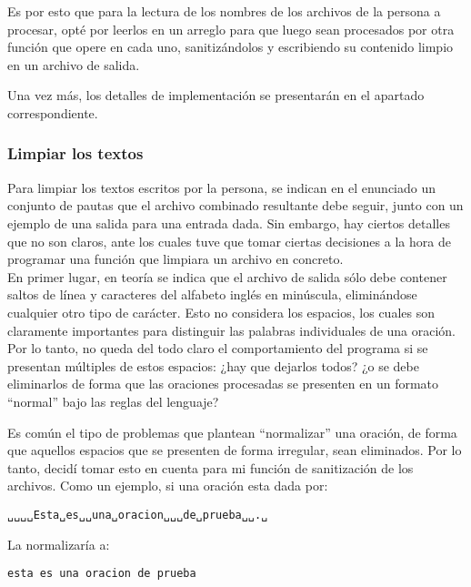 \documentclass[a4paper]{article}
\begin{document}
Es por esto que para la lectura de los nombres de los archivos de la persona a procesar, opté por leerlos en un arreglo para que luego sean procesados por otra función que opere en cada uno, sanitizándolos y escribiendo su contenido limpio en un archivo de salida.

Una vez más, los detalles de implementación se presentarán en el apartado correspondiente.

\subsubsection{Limpiar los textos}

Para limpiar los textos escritos por la persona, se indican en el enunciado un conjunto de pautas que el archivo combinado resultante debe seguir, junto con un ejemplo de una salida para una entrada dada. Sin embargo, hay ciertos detalles que no son claros, ante los cuales tuve que tomar ciertas decisiones a la hora de programar una función que limpiara un archivo en concreto. \\

En primer lugar, en teoría se indica que el archivo de salida sólo debe contener saltos de línea y caracteres del alfabeto inglés en minúscula, eliminándose cualquier otro tipo de carácter. Esto no considera los espacios, los cuales son claramente importantes para distinguir las palabras individuales de una oración. Por lo tanto, no queda del todo claro el comportamiento del programa si se presentan múltiples de estos espacios: ¿hay que dejarlos todos? ¿o se debe eliminarlos de forma que las oraciones procesadas se presenten en un formato ``normal'' bajo las reglas del lenguaje?

Es común el tipo de problemas que plantean ``normalizar'' una oración, de forma que aquellos espacios que se presenten de forma irregular, sean eliminados. Por lo tanto, decidí tomar esto en cuenta para mi función de sanitización de los archivos. Como un ejemplo, si una oración esta dada por:

\begin{tcolorbox}
    \texttt{␣␣␣␣Esta␣es␣␣una␣oracion␣␣␣de␣prueba␣␣.␣}
\end{tcolorbox}

\noindent{}La normalizaría a:

\begin{tcolorbox}
    \texttt{esta es una oracion de prueba}
\end{tcolorbox}

\vspace{10pt}
\end{document}
